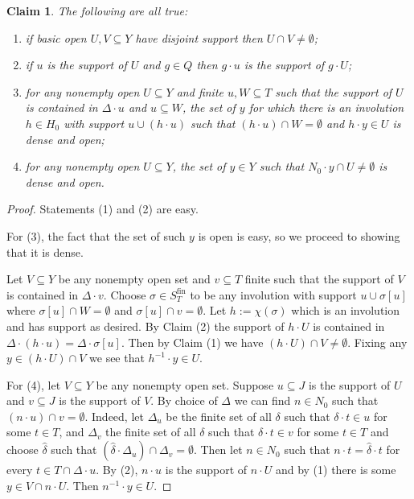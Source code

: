 \documentclass[12pt]{amsart}
\theoremstyle{plain}
\newtheorem{claim}{Claim}
\theoremstyle{definition}
\newcommand{\fin}{\text{fin}}
\begin{document}
\begin{claim}\label{claim:density}
The following are all true:
\begin{enumerate}
\item if basic open $U, V \subseteq Y$ have disjoint support then $U \cap V \neq \emptyset$;
\item if $u$ is the support of $U$ and $g \in Q$ then $g \cdot u$ is the support of $g \cdot U$;
\item for any nonempty open $U \subseteq Y$ and finite $u, W \subseteq T$ such that the support of $U$ is contained in $\Delta \cdot u$ and $u \subseteq W$, the set of $y$ for which there is an involution $h \in H_0$ with support $u \cup (h \cdot u)$ such that $(h \cdot u) \cap W = \emptyset$ and $h \cdot y \in U$ is dense and open;
\item for any nonempty open $U \subseteq Y$, the set of $y \in Y$ such that $N_0 \cdot y \cap U \neq \emptyset$ is dense and open.
\end{enumerate}
\end{claim}

\begin{proof}
Statements (1) and (2) are easy.

For (3), the fact that the set of such $y$ is open is easy, so we proceed to showing that it is dense.

Let $V \subseteq Y$ be any nonempty open set and $v \subseteq T$ finite such that the support of $V$ is contained in $\Delta \cdot v$.
Choose $\sigma \in S_T^\fin$ to be any involution with support $u \cup \sigma[u]$ where $\sigma[u] \cap W = \emptyset$ and $\sigma[u] \cap v = \emptyset$.
Let $h := \chi(\sigma)$ which is an involution and has support as desired.
By Claim (2) the support of $h \cdot U$ is contained in $\Delta \cdot (h \cdot u) = \Delta \cdot \sigma[u]$.
Then by Claim (1) we have $(h \cdot U) \cap V \neq \emptyset$.
Fixing any $y \in (h \cdot U) \cap V$ we see that $h^{-1} \cdot y \in U$.

For (4), let $V \subseteq Y$ be any nonempty open set.
Suppose $u \subseteq J$ is the support of $U$ and $v \subseteq J$ is the support of $V$.
By choice of $\Delta$ we can find $n \in N_0$ such that $(n \cdot u) \cap v = \emptyset$.
Indeed, let $\Delta_u$ be the finite set of all $\delta$ such that $\delta \cdot t \in u$ for some $t \in T$, and $\Delta_v$ the finite set of all $\delta$ such that $\delta \cdot t \in v$ for some $t \in T$ and choose $\hat{\delta}$ such that $(\hat{\delta} \cdot \Delta_u) \cap \Delta_v = \emptyset$.
Then let $n \in N_0$ such that $n \cdot t = \hat{\delta} \cdot t$ for every $t \in T \cap \Delta \cdot u$.
By (2), $n \cdot u$ is the support of $n \cdot U$ and by (1) there is some $y \in V \cap n \cdot U$.
Then $n^{-1} \cdot y \in U$.
\end{proof}
\end{document}
